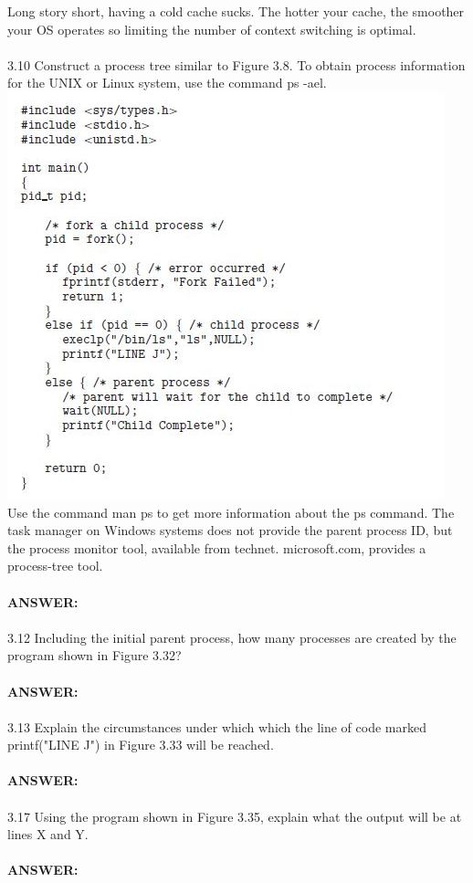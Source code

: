 \documentclass[12pt]{article}
\begin{document}
\noindent Long story short, having a cold cache sucks. The hotter your cache, the smoother 
your OS operates so limiting the number of context switching is optimal.\\\\
3.10 Construct a process tree similar to Figure 3.8. To obtain process information
for the UNIX or Linux system, use the command ps -ael.\\
\includegraphics{code.jpg}\\
Use the command man ps to get more information about the ps command.
The task manager on Windows systems does not provide the
parent process ID, but the process monitor tool, available from technet.
microsoft.com, provides a process-tree tool.\\\\
\textbf{ANSWER: }\\\\
3.12 Including the initial parent process, how many processes are created by
the program shown in Figure 3.32?\\\\
\textbf{ANSWER: }\\\\
3.13 Explain the circumstances under which which the line of code marked
printf("LINE J") in Figure 3.33 will be reached.\\\\
\textbf{ANSWER: }\\\\
3.17 Using the program shown in Figure 3.35, explain what the output will
be at lines X and Y.\\\\
\textbf{ANSWER: }\\\\
\end{document}
